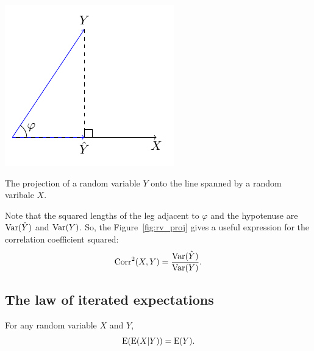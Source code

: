 \begin{marginfigure}
\includegraphics{figures/01_basic_projection.pdf}
\caption{The projection of a random variable $Y$ onto the line spanned by
a random varibale $X$.}
\label{fig:rv_proj}
\end{marginfigure}

Note that the squared lengths of the leg adjacent to $\varphi$ and the
hypotenuse are $\operatorname{Var}(\hat Y)$ and $\operatorname{Var}(Y)$.
So, the Figure~\ref{fig:rv_proj} gives a useful expression for the correlation
coefficient squared:
\[
\operatorname{Corr}^2(X,Y) = \frac{\operatorname{Var}(\hat Y)}{\operatorname{Var}(Y)}.
\]

\subsection{The law of iterated expectations}


\begin{theorem}
For any random variable $X$ and $Y$,
\[
\operatorname{E}(\operatorname{E}(X|Y)) = \operatorname{E}(Y).
\]
\end{theorem}

